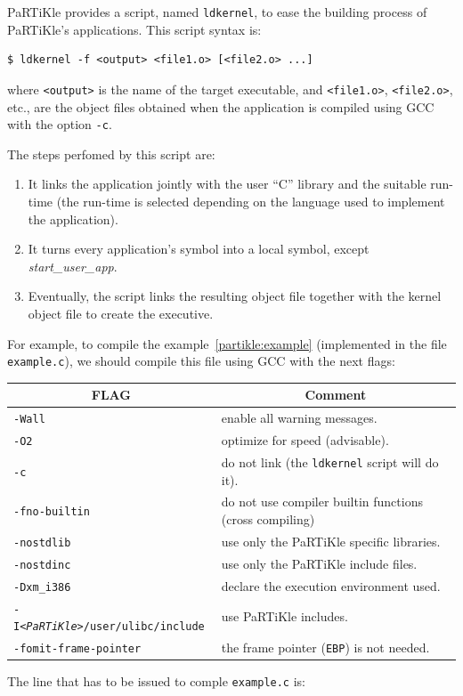 \documentclass[a4paper,10pt,twoside]{report}
\newcommand{\partikle}[0]{PaRTiKle}
\begin{document}
PaRTiKle provides a script, named \texttt{ldkernel}, to ease the
building process of PaRTiKle's applications. This script syntax is:

\begin{verbatim}
$ ldkernel -f <output> <file1.o> [<file2.o> ...]
\end{verbatim}
 
where \verb#<output># is the name of the target executable, and
\verb#<file1.o>#, \verb#<file2.o>#, etc., are the object files
obtained when the application is compiled using GCC with the option
\texttt{-c}.

The steps perfomed by this script are:

\begin{enumerate}
\item It links the application jointly with the user ``C'' library and
  the suitable run-time (the run-time is selected depending on the
  language used to implement the application).
\item It turns every application's symbol into a local symbol, except
  \textit{start\_user\_app}.
\item Eventually, the script links the resulting object file together
  with the kernel object file to create the executive.
\end{enumerate}

For example, to compile the example~\ref{partikle:example}
(implemented in the file \texttt{example.c}), we should compile this
file using GCC with the next flags:
\begin{table}[h]\centering
\begin{tabular}{ll}
\multicolumn{1}{c}{FLAG}  & \multicolumn{1}{c}{Comment} \\ \hline
  \texttt{-Wall}         & enable all warning messages.\\
  \texttt{-O2}           & optimize for speed (advisable).\\
  \texttt{-c}            & do not link (the \texttt{ldkernel} script will do it).\\
  \texttt{-fno-builtin}  & do not use compiler builtin functions (cross
  compiling) \\
  \texttt{-nostdlib}     & use only the \partikle{} specific libraries.\\
  \texttt{-nostdinc}     & use only the \partikle{} include files.\\
  \texttt{-Dxm\_i386}    & declare the execution environment used.\\
  \texttt{-I\textit{<PaRTiKle>}/user/ulibc/include} & use PaRTiKle includes.\\
  \texttt{-fomit-frame-pointer} &  the frame pointer (\texttt{EBP}) is
  not needed. \\ \hline
\end{tabular}
\end{table}
The line that has to be issued to comple \texttt{example.c} is:
\end{document}
